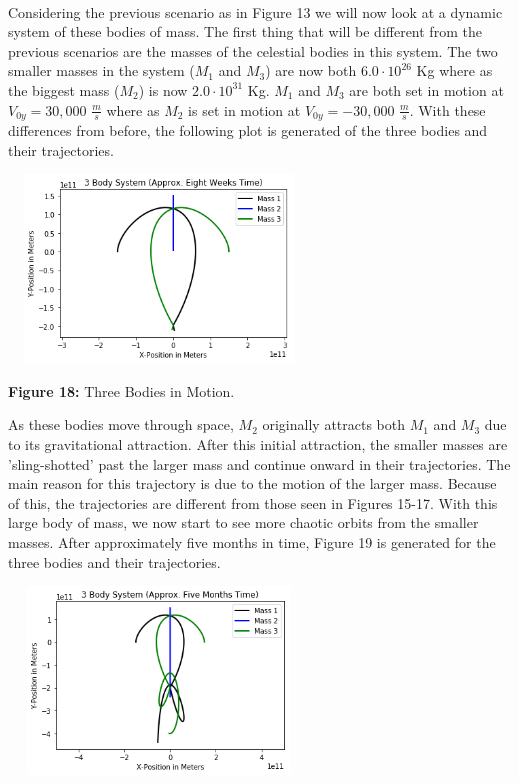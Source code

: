 \documentclass[]{article}
\begin{document}
\begin{multicols}{2}
\paragraph{}
\setlength{\parskip}{1em}
Considering the previous scenario as in Figure 13 we will now look at a dynamic system of these bodies of mass. The first thing that will be different from the previous scenarios are the masses of the celestial bodies in this system. The two smaller masses in the system ($M_1$ and $M_3$) are now both $6.0\cdot10^{26}$ Kg where as the biggest mass ($M_2$) is now $2.0\cdot10^{31}$ Kg. $M_1$ and $M_3$ are both set in motion at $V_{0y}=30,000$ $\frac{m}{s}$ where as $M_2$ is set in motion at $V_{0y}=-30,000$ $\frac{m}{s}$. With these differences from before, the following plot is generated of the three bodies and their trajectories.
\begin{center}
\includegraphics[width=8cm, height=5cm]{PHYS 342 FP 3-Body Dynamics (6).png}
\caption{\small{\textbf{Figure 18:}} \tiny{Three Bodies in Motion.}}
\end{center}
As these bodies move through space, $M_2$ originally attracts both $M_1$ and $M_3$ due to its gravitational attraction. After this initial attraction, the smaller masses are 'sling-shotted' past the larger mass and continue onward in their trajectories. The main reason for this trajectory is due to the motion of the larger mass. Because of this, the trajectories are different from those seen in Figures 15-17. With this large body of mass, we now start to see more chaotic orbits from the smaller masses. After approximately five months in time, Figure 19 is generated for the three bodies and their trajectories.
\begin{center}
\includegraphics[width=8cm, height=5cm]{PHYS 342 FP 3-Body Dynamics (7).png}

\end{center}
\end{multicols}
\end{document}
